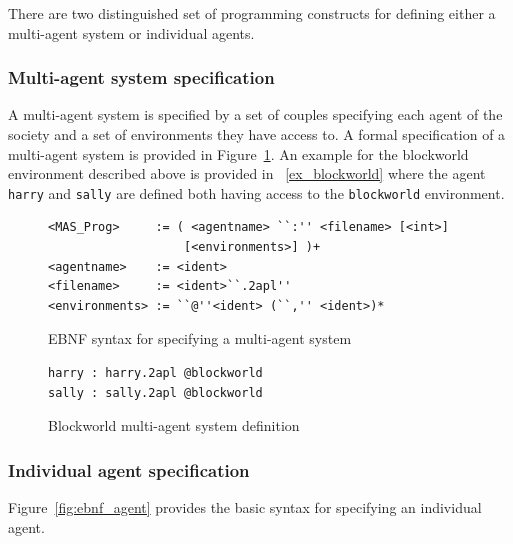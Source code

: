 \documentclass[a4paper]{article}
\begin{document}
There are two distinguished set of programming constructs for defining either a multi-agent system or individual agents.

\subsubsection{Multi-agent system specification} %

A multi-agent system is specified by a set of couples specifying each agent of the society and a set of environments they have access to. A formal specification of a multi-agent system is provided in Figure~\ref{fig:ebnf_mas}. An example for the blockworld environment described above is provided in ~\ref{ex_blockworld} where the agent \texttt{harry} and \texttt{sally} are defined both having access to the \texttt{blockworld} environment.

\begin{figure}[htbp]
\begin{verbatim}
<MAS_Prog>     := ( <agentname> ``:'' <filename> [<int>]
                   [<environments>] )+
<agentname>    := <ident>
<filename>     := <ident>``.2apl''
<environments> := ``@''<ident> (``,'' <ident>)*
\end{verbatim}
\caption{EBNF syntax for specifying a multi-agent system}
\label{fig:ebnf_mas}
\end{figure}

\begin{figure}[htbp]
\begin{verbatim}
harry : harry.2apl @blockworld
sally : sally.2apl @blockworld
\end{verbatim}
\caption{Blockworld multi-agent system definition}
\label{fig:ex_blockworld}
\end{figure}

\subsubsection{Individual agent specification} %

 
% 
% 

Figure~\ref{fig:ebnf_agent} provides the basic syntax for specifying an individual agent.
\end{document}
